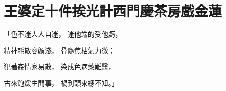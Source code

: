 %

\chapter{王婆定十件挨光計\KG 西門慶茶房戲金蓮}

\begin{showcontents}{}



「色不迷人人自迷，  迷他端的受他虧，

精神耗散容顏淺，  骨髓焦枯氣力微；

犯著姦情家易散，  染成色病藥難醫，

古來飽煖生閒事，  禍到頭來總不知。」


\end{showcontents}
